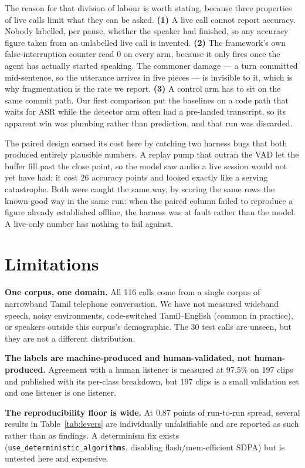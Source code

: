 \documentclass[11pt]{article}
\newcommand{\pct}{\%}
\begin{document}
The reason for that division of labour is worth stating, because three
properties of live calls limit what they can be asked. \textbf{(1)} A live call
cannot report accuracy. Nobody labelled, per pause, whether the speaker had
finished, so any accuracy figure taken from an unlabelled live call is invented.
\textbf{(2)} The framework's own false-interruption counter read 0 on every arm,
because it only fires once the agent has actually started speaking. The commoner
damage --- a turn committed mid-sentence, so the utterance arrives in five
pieces --- is invisible to it, which is why fragmentation is the rate we
report. \textbf{(3)} A control arm has to sit on the same commit path. Our first
comparison put the baselines on a code path that waits for ASR while the
detector arm often had a pre-landed transcript, so its apparent win was plumbing
rather than prediction, and that run was discarded.

The paired design earned its cost here by catching two harness bugs that both
produced entirely plausible numbers. A replay pump that outran the VAD let the
buffer fill past the close point, so the model saw audio a live session would
not yet have had; it cost 26 accuracy points and looked exactly like a serving
catastrophe. Both were caught the same way, by scoring the same rows the
known-good way in the same run: when the paired column failed to reproduce a
figure already established offline, the harness was at fault rather than the
model. A live-only number has nothing to fail against.

\section{Limitations}

\textbf{One corpus, one domain.} All 116 calls come from a single corpus of
narrowband Tamil telephone conversation. We have not measured wideband speech,
noisy environments, code-switched Tamil--English (common in practice), or
speakers outside this corpus's demographic. The 30 test calls are unseen, but
they are not a different distribution.

\textbf{The labels are machine-produced and human-validated, not human-produced.}
Agreement with a human listener is measured at 97.5\pct{} on 197 clips and
published with its per-class breakdown, but 197 clips is a small validation set
and one listener is one listener.

\textbf{The reproducibility floor is wide.} At 0.87 points of run-to-run spread,
several results in Table~\ref{tab:levers} are individually unfalsifiable and are
reported as such rather than as findings. A determinism fix exists
(\texttt{use\_deterministic\_algorithms}, disabling flash/mem-efficient SDPA) but
is untested here and expensive.
\end{document}
